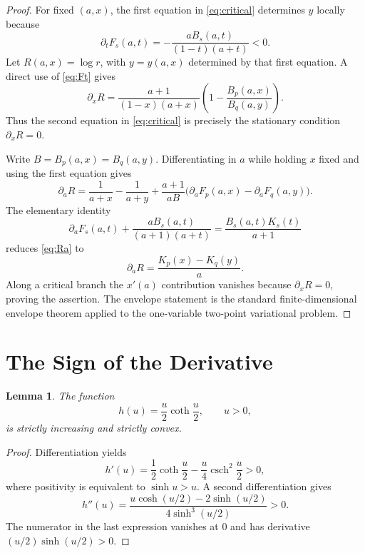 \documentclass[11pt]{article}
\newtheorem{lemma}{Lemma}
\begin{document}
\begin{proof}
For fixed $(a,x)$, the first equation in \eqref{eq:critical} determines $y$
locally because
\begin{equation}\label{eq:Ft}
 \partial_tF_s(a,t)
 =-\frac{aB_s(a,t)}{(1-t)(a+t)}<0.
\end{equation}
Let $R(a,x)=\log r$, with $y=y(a,x)$ determined by that first equation.
A direct use of \eqref{eq:Ft} gives
\[
 \partial_xR
 =\frac{a+1}{(1-x)(a+x)}
   \left(1-\frac{B_p(a,x)}{B_q(a,y)}\right).
\]
Thus the second equation in \eqref{eq:critical} is precisely the stationary
condition $\partial_xR=0$.

Write $B=B_p(a,x)=B_q(a,y)$.  Differentiating in $a$ while holding $x$
fixed and using the first equation gives
\begin{equation}\label{eq:Ra}
 \partial_aR
 =\frac1{a+x}-\frac1{a+y}
  +\frac{a+1}{aB}\bigl(\partial_aF_p(a,x)-\partial_aF_q(a,y)\bigr).
\end{equation}
The elementary identity
\begin{equation}\label{eq:keyidentity}
 \partial_aF_s(a,t)
 +\frac{aB_s(a,t)}{(a+1)(a+t)}
 =\frac{B_s(a,t)K_s(t)}{a+1}
\end{equation}
reduces \eqref{eq:Ra} to
\[
                         \partial_aR=\frac{K_p(x)-K_q(y)}a.
\]
Along a critical branch the $x'(a)$ contribution vanishes because
$\partial_xR=0$, proving the assertion.  The envelope statement is the
standard finite-dimensional envelope theorem applied to the one-variable
two-point variational problem.
\end{proof}

\section*{The Sign of the Derivative}

\begin{lemma}\label{lem:h}
The function
\[
                         h(u)=\frac u2\coth\frac u2,
                         \qquad u>0,
\]
is strictly increasing and strictly convex.
\end{lemma}

\begin{proof}
Differentiation yields
\[
 h'(u)=\frac12\coth\frac u2-\frac u4\operatorname{csch}^2\frac u2>0,
\]
where positivity is equivalent to $\sinh u>u$.  A second differentiation
gives
\[
 h''(u)=
 \frac{u\cosh(u/2)-2\sinh(u/2)}{4\sinh^3(u/2)}>0.
\]
The numerator in the last expression vanishes at $0$ and has derivative
$(u/2)\sinh(u/2)>0$.
\end{proof}
\end{document}
